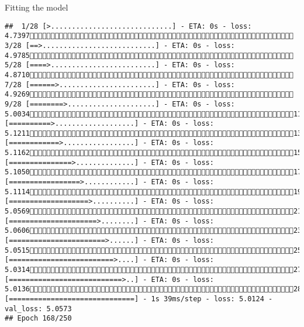 \documentclass[
  ignorenonframetext,
]{beamer}
\begin{document}
\begin{frame}[fragile]{Fitting the model}
\begin{verbatim}
##  1/28 [>.............................] - ETA: 0s - loss: 4.7397 3/28 [==>...........................] - ETA: 0s - loss: 4.9785 5/28 [====>.........................] - ETA: 0s - loss: 4.8710 7/28 [======>.......................] - ETA: 0s - loss: 4.9269 9/28 [========>.....................] - ETA: 0s - loss: 5.003411/28 [==========>...................] - ETA: 0s - loss: 5.121113/28 [============>.................] - ETA: 0s - loss: 5.116215/28 [===============>..............] - ETA: 0s - loss: 5.105017/28 [=================>............] - ETA: 0s - loss: 5.111419/28 [===================>..........] - ETA: 0s - loss: 5.056921/28 [=====================>........] - ETA: 0s - loss: 5.060623/28 [=======================>......] - ETA: 0s - loss: 5.051525/28 [=========================>....] - ETA: 0s - loss: 5.031427/28 [===========================>..] - ETA: 0s - loss: 5.013628/28 [==============================] - 1s 39ms/step - loss: 5.0124 - val_loss: 5.0573
## Epoch 168/250

\end{verbatim}
\end{frame}
\end{document}
